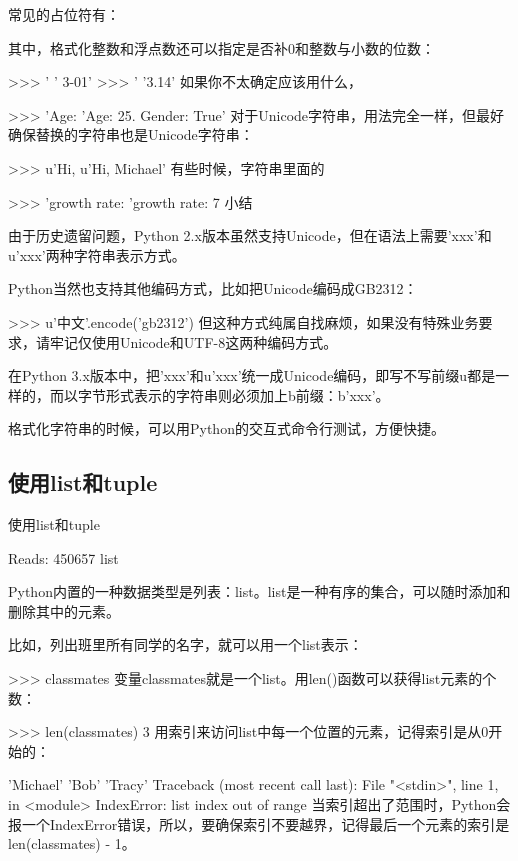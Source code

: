 常见的占位符有：

其中，格式化整数和浮点数还可以指定是否补0和整数与小数的位数：

>>> '%
' 3-01'
>>> '%
'3.14'
如果你不太确定应该用什么，%

>>> 'Age: %
'Age: 25. Gender: True'
对于Unicode字符串，用法完全一样，但最好确保替换的字符串也是Unicode字符串：

>>> u'Hi, %
u'Hi, Michael'
有些时候，字符串里面的%

>>> 'growth rate: %
'growth rate: 7 %
小结

由于历史遗留问题，Python 2.x版本虽然支持Unicode，但在语法上需要'xxx'和u'xxx'两种字符串表示方式。

Python当然也支持其他编码方式，比如把Unicode编码成GB2312：

>>> u'中文'.encode('gb2312')
但这种方式纯属自找麻烦，如果没有特殊业务要求，请牢记仅使用Unicode和UTF-8这两种编码方式。

在Python 3.x版本中，把'xxx'和u'xxx'统一成Unicode编码，即写不写前缀u都是一样的，而以字节形式表示的字符串则必须加上b前缀：b'xxx'。

格式化字符串的时候，可以用Python的交互式命令行测试，方便快捷。


\subsection{使用list和tuple}

使用list和tuple

Reads: 450657
list

Python内置的一种数据类型是列表：list。list是一种有序的集合，可以随时添加和删除其中的元素。

比如，列出班里所有同学的名字，就可以用一个list表示：

>>> classmates
变量classmates就是一个list。用len()函数可以获得list元素的个数：

>>> len(classmates)
3
用索引来访问list中每一个位置的元素，记得索引是从0开始的：

'Michael'
'Bob'
'Tracy'
Traceback (most recent call last):
  File "<stdin>", line 1, in <module>
IndexError: list index out of range
当索引超出了范围时，Python会报一个IndexError错误，所以，要确保索引不要越界，记得最后一个元素的索引是len(classmates) - 1。

